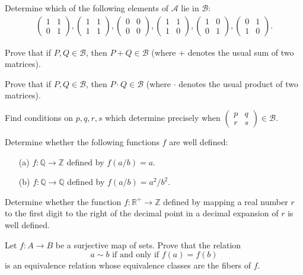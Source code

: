 \documentclass[cn,11pt,chinese]{elegantbook}
\def\real{\mathbb{R}}
\numberwithin{equation}{section}
\begin{document}
\begin{problemset}
\item Determine which of the following elements of $\mathcal{A}$ lie in $\mathcal{B}$:
\begin{gather*}
\begin{pmatrix}
1 & 1\\
0 & 1
\end{pmatrix},
\begin{pmatrix}
1 & 1\\
1 & 1
\end{pmatrix},
\begin{pmatrix}
0 & 0\\
0 & 0
\end{pmatrix},
\begin{pmatrix}
1 & 1\\
1 & 0
\end{pmatrix},
\begin{pmatrix}
1 & 0\\
0 & 1
\end{pmatrix},
\begin{pmatrix}
0 & 1\\
1 & 0
\end{pmatrix}.
\end{gather*}

\item Prove that if $P, Q \in \mathcal{B}$, then $P+Q\in \mathcal{B}$ (where $+$ denotes the usual sum of two matrices).

\item Prove that if $P, Q \in \mathcal{B}$, then $P\cdot Q \in \mathcal{B}$ (where $\cdot$ denotes the usual product of two matrices).

\item Find conditions on $p, q, r, s$ which determine precisely when $\begin{pmatrix}p & q \\r & s\end{pmatrix} \in \mathcal{B}$.

\item Determine whether the following functions $f$ are well defined:
\begin{enumerate}
\item[(a)] $f:\mathbb{Q} \to \mathbb{Z}$ defined by $f(a/b) = a$.
\item[(b)] $f:\mathbb{Q} \to \mathbb{Q}$ defined by $f(a/b) = a^2/b^2$.
\end{enumerate}

\item Determine whether the function $f:\real^+ \to \mathbb{Z}$ defined by mapping a real number $r$ to the first digit to the right of the decimal point in a decimal expansion of $r$ is well defined.

\item Let $f: A \to B$ be a surjective map of sets. Prove that the relation
\[
a \sim b \text{ if and only if } f(a) = f(b)
\]
is an equivalence relation whose equivalence classes are the fibers of $f$.

\end{problemset}
\end{document}
